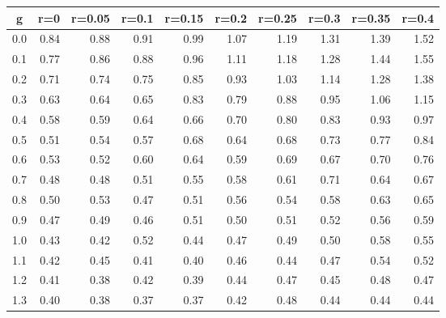 %
\begin{table}[!tbp]
 \begin{center}
 \begin{tabular}{rrrrrrrrrr}\hline\hline
\multicolumn{1}{c}{g}&\multicolumn{1}{c}{r=0}&\multicolumn{1}{c}{r=0.05}&\multicolumn{1}{c}{r=0.1}&\multicolumn{1}{c}{r=0.15}&\multicolumn{1}{c}{r=0.2}&\multicolumn{1}{c}{r=0.25}&\multicolumn{1}{c}{r=0.3}&\multicolumn{1}{c}{r=0.35}&\multicolumn{1}{c}{r=0.4}\tabularnewline
\hline
0.0&0.84&0.88&0.91&0.99&1.07&1.19&1.31&1.39&1.52\tabularnewline
0.1&0.77&0.86&0.88&0.96&1.11&1.18&1.28&1.44&1.55\tabularnewline
0.2&0.71&0.74&0.75&0.85&0.93&1.03&1.14&1.28&1.38\tabularnewline
0.3&0.63&0.64&0.65&0.83&0.79&0.88&0.95&1.06&1.15\tabularnewline
0.4&0.58&0.59&0.64&0.66&0.70&0.80&0.83&0.93&0.97\tabularnewline
0.5&0.51&0.54&0.57&0.68&0.64&0.68&0.73&0.77&0.84\tabularnewline
0.6&0.53&0.52&0.60&0.64&0.59&0.69&0.67&0.70&0.76\tabularnewline
0.7&0.48&0.48&0.51&0.55&0.58&0.61&0.71&0.64&0.67\tabularnewline
0.8&0.50&0.53&0.47&0.51&0.56&0.54&0.58&0.63&0.65\tabularnewline
0.9&0.47&0.49&0.46&0.51&0.50&0.51&0.52&0.56&0.59\tabularnewline
1.0&0.43&0.42&0.52&0.44&0.47&0.49&0.50&0.58&0.55\tabularnewline
1.1&0.42&0.45&0.41&0.40&0.46&0.44&0.47&0.54&0.52\tabularnewline
1.2&0.41&0.38&0.42&0.39&0.44&0.47&0.45&0.48&0.47\tabularnewline
1.3&0.40&0.38&0.37&0.37&0.42&0.48&0.44&0.44&0.44\tabularnewline
\hline
\end{tabular}

\end{center}

\end{table}


